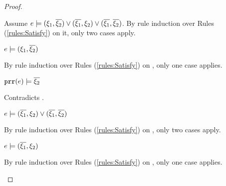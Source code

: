 \begin{proof}
\begin{byCases}
\begin{byCases}
\begin{byCases}
\begin{pfsteps*}
            \end{pfsteps*}
            Assume $e \models (\xi_1 , \overline{\xi_2}) \vee (\overline{\xi_1} , \xi_2) \vee (\overline{\xi_1} , \overline{\xi_2})$. By rule induction over Rules (\ref{rules:Satisfy}) on it, only two cases apply.
            \begin{byCases}
            \item[\text{(\ref{rule:CSOr1})}]
                \begin{pfsteps*}
                \item $e \models (\xi_1 , \overline{\xi_2})$  
                \end{pfsteps*}
                By rule induction over Rules (\ref{rules:Satisfy}) on , only one case applies.
                \begin{byCases}
                \item[\text{(\ref{rule:CSNotValPair})}]
                    \begin{pfsteps*}
                    \item $\mathtt{prr}(e) \models \overline{\xi_2}$ 
                    \end{pfsteps*}
                    Contradicts .
                \end{byCases}
            \item[\text{(\ref{rule:CSOr2})}]
                \begin{pfsteps*}
                \item $e \models (\overline{\xi_1} , \xi_2) \vee (\overline{\xi_1} , \overline{\xi_2})$  
                \end{pfsteps*}
                By rule induction over Rules (\ref{rules:Satisfy}) on , only two cases apply.
                \begin{byCases}
                \item[\text{(\ref{rule:CSOr1})}]
                    \begin{pfsteps*}
                    \item $e \models (\overline{\xi_1} , \xi_2)$  
                    \end{pfsteps*}
                    By rule induction over Rules (\ref{rules:Satisfy}) on , only one case applies.

\end{byCases}
\end{byCases}
\end{byCases}
\end{byCases}
\end{byCases}
\end{proof}
